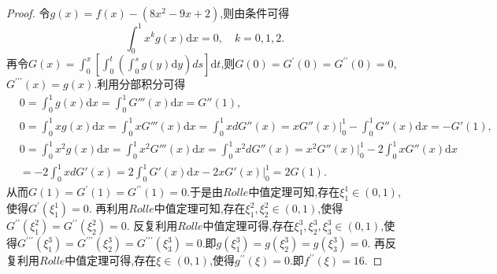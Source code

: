 \documentclass[../../main.tex]{subfiles}
\begin{document}
\begin{proof}
令\(g(x)=f(x)-(8x^2 - 9x + 2)\),则由条件可得
\[
\int_0^1 x^k g(x)\mathrm{d}x = 0, \quad k = 0,1,2.
\]
再令\(G(x)=\int_0^x\left[\int_0^t\left(\int_0^s g(y)\mathrm{d}y\right)ds\right]\mathrm{d}t\),则\(G(0)=G^\prime(0)=G^{\prime\prime}(0)=0\),\(G^{\prime\prime\prime}(x)=g(x)\).利用分部积分可得
\begin{align*}
&0=\int_0^1{g\left( x \right) \mathrm{d}x}=\int_0^1{G'''\left( x \right) \mathrm{d}x}=G''\left( 1 \right) ,
\\
&0=\int_0^1{xg\left( x \right) \mathrm{d}x}=\int_0^1{xG'''\left( x \right) \mathrm{d}x}=\int_0^1{xdG''\left( x \right)}=xG''\left( x \right) \Big |_{0}^{1}-\int_0^1{G''\left( x \right) \mathrm{d}x}=-G'\left( 1 \right) ,
\\
&0=\int_0^1{x^2g\left( x \right) \mathrm{d}x}=\int_0^1{x^2G'''\left( x \right) \mathrm{d}x}=\int_0^1{x^2dG''\left( x \right)}=x^2G''\left( x \right) \Big |_{0}^{1}-2\int_0^1{xG''\left( x \right) \mathrm{d}x}
\\
&=-2\int_0^1{xdG'\left( x \right)}=2\int_0^1{G'\left( x \right) \mathrm{d}x}-2xG'\left( x \right) \Big |_{0}^{1}=2G\left( 1 \right) .
\end{align*}
从而\(G(1)=G^\prime(1)=G^{\prime\prime}(1)=0\).于是由\(Rolle\)中值定理可知,存在\(\xi_1^1\in(0,1)\),使得\(G^\prime(\xi_1^1)=0\).
再利用\(Rolle\)中值定理可知,存在\(\xi_1^2,\xi_2^2\in(0,1)\),使得\(G^{\prime\prime}(\xi_1^2)=G^{\prime\prime}(\xi_2^2)=0\).
反复利用\(Rolle\)中值定理可得,存在\(\xi_1^3,\xi_2^3,\xi_3^3\in(0,1)\),使得\(G^{\prime\prime\prime}(\xi_1^3)=G^{\prime\prime\prime}(\xi_2^3)=G^{\prime\prime\prime}(\xi_3^3)=0\).即\(g(\xi_1^3)=g(\xi_2^3)=g(\xi_3^3)=0\).
再反复利用\(Rolle\)中值定理可得,存在\(\xi\in(0,1)\),使得\(g^{\prime\prime}(\xi)=0\).即\(f^{\prime\prime}(\xi)=16\).
\end{proof}
\end{document}
